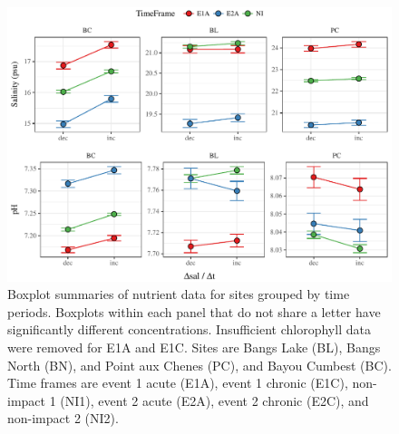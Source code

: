 \documentclass[letterpaper,12pt]{article}\usepackage[]{graphicx}\usepackage[]{color}
\makeatletter
\def\maxwidth{ %
  \ifdim\Gin@nat@width>\linewidth
    \linewidth
  \else
    \Gin@nat@width
  \fi
}
\makeatother
\begin{document}
\begin{figure}[!ht]

{\centering \includegraphics[width=\maxwidth]{figs/Fig7} 

}

\caption[Boxplot summaries of nutrient data for sites grouped by time periods]{Boxplot summaries of nutrient data for sites grouped by time periods. Boxplots within each panel that do not share a letter have significantly different concentrations. Insufficient chlorophyll data were removed for E1A and E1C. Sites are Bangs Lake (BL), Bangs North (BN), and Point aux Chenes (PC), and Bayou Cumbest (BC).  Time frames are event 1 acute (E1A), event 1 chronic (E1C), non-impact 1 (NI1), event 2 acute (E2A), event 2 chronic (E2C), and non-impact 2 (NI2).}\label{fig:Fig7}
\end{figure}
\end{document}
